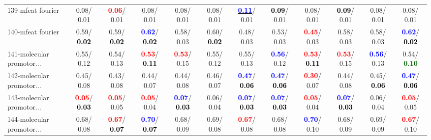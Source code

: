 \begin{table}[h]
\begin{center}
{\begin{tabular}{lc|c|c|c|c|c|c|c|c|c|c}
139-mfeat fourier &   0.08/  0.01 & \textcolor{red}{\textbf{  0.06}}/  0.01 &   0.08/  0.01 &   0.08/  0.01 &   0.08/  0.01 & \underline{\textcolor{blue}{\textbf{  0.11}}}/  0.01 & \textcolor{black}{\textbf{  0.09}}/  0.01 &   0.08/  0.01 & \textcolor{black}{\textbf{  0.09}}/  0.01 &   0.08/  0.01 &   0.08/  0.01 \\
140-mfeat fourier &   0.59/\textcolor{black}{\textbf{  0.02}} &   0.59/\textcolor{black}{\textbf{  0.02}} & \textcolor{blue}{\textbf{  0.62}}/\textcolor{black}{\textbf{  0.02}} &   0.58/  0.03 &   0.60/\textcolor{black}{\textbf{  0.02}} &   0.48/  0.03 &   0.53/  0.03 & \textcolor{red}{\textbf{  0.45}}/  0.03 &   0.58/  0.03 &   0.58/  0.03 & \textcolor{blue}{\textbf{  0.62}}/\textcolor{black}{\textbf{  0.02}} \\
141-molecular promotor... &   0.55/  0.12 &   0.54/  0.13 & \textcolor{red}{\textbf{  0.53}}/\textcolor{black}{\textbf{  0.11}} & \textcolor{red}{\textbf{  0.53}}/  0.15 &   0.55/  0.12 &   0.55/  0.13 & \textcolor{blue}{\textbf{  0.56}}/  0.12 & \textcolor{red}{\textbf{  0.53}}/\textcolor{black}{\textbf{  0.11}} & \textcolor{red}{\textbf{  0.53}}/  0.15 & \textcolor{blue}{\textbf{  0.56}}/  0.13 &   0.54/\textcolor{darkgreen}{\textbf{  0.10}} \\
142-molecular promotor... &   0.45/  0.08 &   0.43/  0.08 &   0.44/  0.07 &   0.44/  0.08 &   0.46/  0.07 & \textcolor{blue}{\textbf{  0.47}}/\textcolor{black}{\textbf{  0.06}} & \textcolor{blue}{\textbf{  0.47}}/\textcolor{black}{\textbf{  0.06}} & \textcolor{red}{\textbf{  0.30}}/  0.07 &   0.44/  0.08 &   0.45/\textcolor{black}{\textbf{  0.06}} & \textcolor{blue}{\textbf{  0.47}}/\textcolor{black}{\textbf{  0.06}} \\ \hline
143-molecular promotor... & \textcolor{red}{\textbf{  0.05}}/\textcolor{black}{\textbf{  0.03}} & \textcolor{red}{\textbf{  0.05}}/  0.05 & \textcolor{red}{\textbf{  0.05}}/  0.04 & \textcolor{blue}{\textbf{  0.07}}/\textcolor{black}{\textbf{  0.03}} &   0.06/  0.04 & \textcolor{blue}{\textbf{  0.07}}/\textcolor{black}{\textbf{  0.03}} & \textcolor{blue}{\textbf{  0.07}}/\textcolor{black}{\textbf{  0.03}} & \textcolor{red}{\textbf{  0.05}}/  0.04 & \textcolor{blue}{\textbf{  0.07}}/\textcolor{black}{\textbf{  0.03}} &   0.06/  0.04 & \textcolor{red}{\textbf{  0.05}}/  0.05 \\
144-molecular promotor... &   0.68/  0.08 & \textcolor{red}{\textbf{  0.67}}/\textcolor{black}{\textbf{  0.07}} & \textcolor{blue}{\textbf{  0.70}}/\textcolor{black}{\textbf{  0.07}} &   0.68/  0.09 &   0.69/  0.08 & \textcolor{red}{\textbf{  0.67}}/  0.08 &   0.68/  0.08 & \textcolor{blue}{\textbf{  0.70}}/  0.10 &   0.68/  0.09 &   0.69/  0.09 & \textcolor{red}{\textbf{  0.67}}/  0.10 \\

\end{tabular}}
\end{center}
\end{table}
